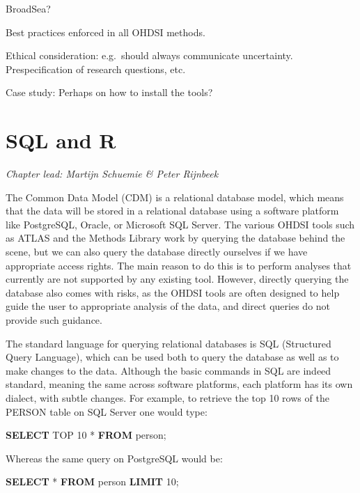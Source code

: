 \documentclass[11pt]{book}
\newenvironment{Shaded}{\begin{snugshade}}{\end{snugshade}}
\newcommand{\KeywordTok}[1]{\textcolor[rgb]{0.13,0.29,0.53}{\textbf{#1}}}
\newcommand{\DecValTok}[1]{\textcolor[rgb]{0.00,0.00,0.81}{#1}}
\newcommand{\NormalTok}[1]{#1}
\begin{document}
BroadSea?

Best practices enforced in all OHDSI methods.

Ethical consideration: e.g.~should always communicate uncertainty.
Prespecification of research questions, etc.

Case study: Perhaps on how to install the tools?

\chapter{SQL and R}\label{SqlAndR}

\emph{Chapter lead: Martijn Schuemie \& Peter Rijnbeek}

The Common Data Model (CDM) is a relational database model, which means
that the data will be stored in a relational database using a software
platform like PostgreSQL, Oracle, or Microsoft SQL Server. The various
OHDSI tools such as ATLAS and the Methods Library work by querying the
database behind the scene, but we can also query the database directly
ourselves if we have appropriate access rights. The main reason to do
this is to perform analyses that currently are not supported by any
existing tool. However, directly querying the database also comes with
risks, as the OHDSI tools are often designed to help guide the user to
appropriate analysis of the data, and direct queries do not provide such
guidance.

The standard language for querying relational databases is SQL
(Structured Query Language), which can be used both to query the
database as well as to make changes to the data. Although the basic
commands in SQL are indeed standard, meaning the same across software
platforms, each platform has its own dialect, with subtle changes. For
example, to retrieve the top 10 rows of the PERSON table on SQL Server
one would type:

\begin{Shaded}
\begin{Highlighting}[]
\KeywordTok{SELECT}\NormalTok{ TOP }\DecValTok{10}\NormalTok{ * }\KeywordTok{FROM}\NormalTok{ person;}
\end{Highlighting}
\end{Shaded}

Whereas the same query on PostgreSQL would be:

\begin{Shaded}
\begin{Highlighting}[]
\KeywordTok{SELECT}\NormalTok{ * }\KeywordTok{FROM}\NormalTok{ person }\KeywordTok{LIMIT} \DecValTok{10}\NormalTok{;}
\end{Highlighting}
\end{Shaded}
\end{document}
